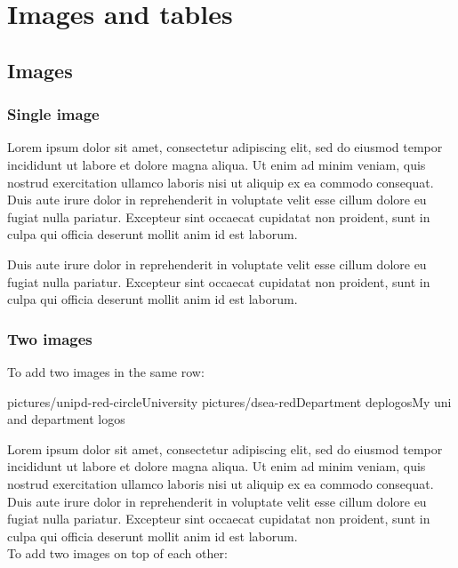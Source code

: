 \chapter{Images and tables}

\section{Images}
\label{images}

\subsection{Single image}

Lorem ipsum dolor sit amet, consectetur adipiscing elit, sed do eiusmod tempor incididunt ut labore et dolore magna aliqua. Ut enim ad minim veniam, quis nostrud exercitation ullamco laboris nisi ut aliquip ex ea commodo consequat. Duis aute irure dolor in reprehenderit in voluptate velit esse cillum dolore eu fugiat nulla pariatur. Excepteur sint occaecat cupidatat non proident, sunt in culpa qui officia deserunt mollit anim id est laborum.

\begin{outerImage}
\end{outerImage}

Duis aute irure dolor in reprehenderit in voluptate velit esse cillum dolore eu fugiat nulla pariatur.  Excepteur sint occaecat cupidatat non proident, sunt in culpa qui officia deserunt mollit anim id est laborum.

\subsection{Two images}

To add two images in the same row:

\begin{outerImage}
 \innerImageTwoH
 {pictures/unipd-red-circle}{University}
 {pictures/dsea-red}{Department}
 {deplogos}{My uni and department logos}
\end{outerImage}

Lorem ipsum dolor sit amet, consectetur adipiscing elit, sed do eiusmod tempor incididunt ut labore et dolore magna aliqua. Ut enim ad minim veniam, quis nostrud exercitation ullamco laboris nisi ut aliquip ex ea commodo consequat. Duis aute irure dolor in reprehenderit in voluptate velit esse cillum dolore eu fugiat nulla pariatur. Excepteur sint occaecat cupidatat non proident, sunt in culpa qui officia deserunt mollit anim id est laborum.\\
To add two images on top of each other:

